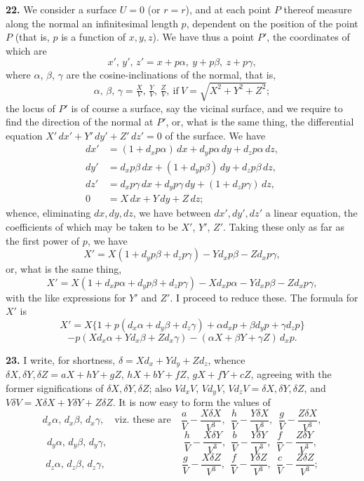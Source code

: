 \documentclass[11pt,a4paper]{article}
\theoremstyle{plain}
\begin{document}
\textbf{22.} We consider a surface $U = 0$ (or $r = r$), and at each point $P$ thereof measure
along the normal an infinitesimal length $p$, dependent on the position of the point $P$
(that is, $p$ is a function of $x, y, z$).  We have thus a point $P'$, the coordinates of
which are
\[
x',\, y',\, z' = x + p\alpha,\ y + p\beta,\ z + p\gamma,
\]
where $\alpha$, $\beta$, $\gamma$ are the cosine-inclinations of the normal, that is,
\[
\alpha,\, \beta,\, \gamma = \tfrac{X}{V},\, \tfrac{Y}{V},\, \tfrac{Z}{V},\ \text{if}\ V = \sqrt{X^2 + Y^2 + Z^2};
\]
the locus of $P'$ is of course a surface, say the vicinal surface, and we require to find
the direction of the normal at $P'$, or, what is the same thing, the differential equation
$X'\,dx' + Y'\,dy' + Z'\,dz' = 0$ of the surface.  We have
\begin{align*}
dx' &= (1 + d_x p\alpha)\,dx + d_y p\alpha\,dy + d_z p\alpha\,dz, \\
dy' &= d_x p\beta\,dx + (1 + d_y p\beta)\,dy + d_z p\beta\,dz, \\
dz' &= d_x p\gamma\,dx + d_y p\gamma\,dy + (1 + d_z p\gamma)\,dz, \\
0 &= X\,dx + Y\,dy + Z\,dz;
\end{align*}
whence, eliminating $dx, dy, dz$, we have between $dx', dy', dz'$ a linear equation, the
coefficients of which may be taken to be $X'$, $Y'$, $Z'$.  Taking these only as far as the
first power of $p$, we have
\[
X' = X(1 + d_y p\beta + d_z p\gamma) - Y d_x p\beta - Z d_x p\gamma,
\]
or, what is the same thing,
\[
X' = X(1 + d_x p\alpha + d_y p\beta + d_z p\gamma) - X d_x p\alpha - Y d_x p\beta - Z d_x p\gamma,
\]
with the like expressions for $Y'$ and $Z'$.  I proceed to reduce these.  The formula for $X'$ is
\[
X' = X\{1 + p(d_x\alpha + d_y\beta + d_z\gamma) + \alpha d_x p + \beta d_y p + \gamma d_z p\}
\]
\[
- p(X d_x\alpha + Y d_x\beta + Z d_x\gamma) - (\alpha X + \beta Y + \gamma Z)\,d_x p.
\]

\textbf{23.} I write, for shortness, $\delta = X d_x + Y d_y + Z d_z$, whence $\delta X, \delta Y, \delta Z = aX + hY + gZ$,
$hX + bY + fZ$, $gX + fY + cZ$, agreeing with the former significations of $\delta X, \delta Y, \delta Z$; also
$V d_x V$, $V d_y V$, $V d_z V = \delta X, \delta Y, \delta Z$, and $V \delta V = X\delta X + Y\delta Y + Z\delta Z$.  It is now easy to
form the values of
\[
d_x\alpha,\, d_x\beta,\, d_x\gamma,\quad \text{viz.\ these are}\quad \frac{a}{V} - \frac{X\delta X}{V^3},\ \ \frac{h}{V} - \frac{Y\delta X}{V^3},\ \ \frac{g}{V} - \frac{Z\delta X}{V^3},
\]
\[
d_y\alpha,\, d_y\beta,\, d_y\gamma,\quad \phantom{\text{viz.\ these are}\quad} \frac{h}{V} - \frac{X\delta Y}{V^3},\ \ \frac{b}{V} - \frac{Y\delta Y}{V^3},\ \ \frac{f}{V} - \frac{Z\delta Y}{V^3},
\]
\[
d_z\alpha,\, d_z\beta,\, d_z\gamma,\quad \phantom{\text{viz.\ these are}\quad} \frac{g}{V} - \frac{X\delta Z}{V^3},\ \ \frac{f}{V} - \frac{Y\delta Z}{V^3},\ \ \frac{c}{V} - \frac{Z\delta Z}{V^3};
\]
\end{document}

